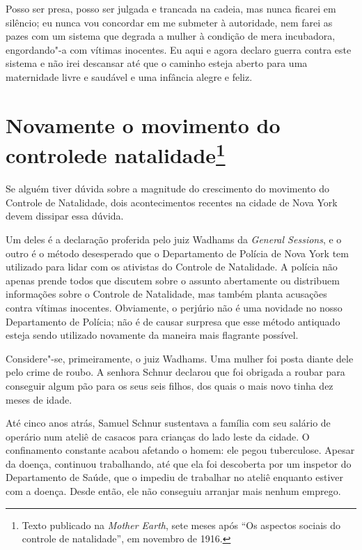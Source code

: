 Posso ser presa, posso ser julgada e trancada na cadeia, mas nunca
ficarei em silêncio; eu nunca vou concordar em me submeter à autoridade,
nem farei as pazes com um sistema que degrada a mulher à condição de
mera incubadora, engordando"-a com vítimas inocentes. Eu aqui e agora
declaro guerra contra este sistema e não irei descansar até que o
caminho esteja aberto para uma maternidade livre e saudável e uma
infância alegre e feliz.

\chapter[Novamente o movimento do controle de natalidade]{Novamente o movimento do controle\break de natalidade\footnote{Texto publicado
  na \textit{Mother Earth}, sete meses após ``Os aspectos sociais do
  controle de natalidade'', em novembro de 1916.}}

Se alguém tiver dúvida sobre a magnitude do crescimento do movimento do
Controle de Natalidade, dois acontecimentos recentes na cidade de Nova
York devem dissipar essa dúvida.

Um deles é a declaração proferida pelo juiz Wadhams da \textit{General
Sessions}, e o outro é o método desesperado que o Departamento de
Polícia de Nova York tem utilizado para lidar com os ativistas do
Controle de Natalidade. A polícia não apenas prende todos que discutem
sobre o assunto abertamente ou distribuem informações sobre o Controle
de Natalidade, mas também planta acusações contra vítimas inocentes.
Obviamente, o perjúrio não é uma novidade no nosso Departamento de
Polícia; não é de causar surpresa que esse método antiquado esteja sendo
utilizado novamente da maneira mais flagrante possível.

Considere"-se, primeiramente, o juiz Wadhams. Uma mulher foi posta diante
dele pelo crime de roubo. A senhora Schnur declarou que foi obrigada a
roubar para conseguir algum pão para os seus seis filhos, dos quais o
mais novo tinha dez meses de idade.

Até cinco anos atrás, Samuel Schnur sustentava a família com seu
salário de operário num ateliê de casacos para crianças do lado leste da
cidade. O confinamento constante acabou afetando o homem: ele pegou
tuberculose. Apesar da doença, continuou trabalhando, até que ela foi
descoberta por um inspetor do Departamento de Saúde, que o impediu de
trabalhar no ateliê enquanto estiver com a doença. Desde então, ele não
conseguiu arranjar mais nenhum emprego.

